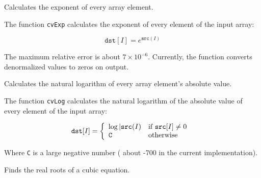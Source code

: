 Calculates the exponent of every array element.


\begin{description}
\end{description}


The function \texttt{cvExp} calculates the exponent of every element of the input array:

\[
\texttt{dst} [I] = e^{\texttt{src}(I)}
\]

The maximum relative error is about $7 \times 10^{-6}$. Currently, the function converts denormalized values to zeros on output.

\label{Log}

Calculates the natural logarithm of every array element's absolute value.


\begin{description}
\end{description}

The function \texttt{cvLog} calculates the natural logarithm of the absolute value of every element of the input array:

\[
\texttt{dst} [I] = \left\{ \begin{array}{l l} \log{|\texttt{src}(I)} & \mbox{if $\texttt{src}[I] \ne 0$ }\\ \texttt{C} & \mbox{otherwise}\\ \end{array} \right.
\]

Where \texttt{C} is a large negative number ( about -700 in the current implementation).

\label{SolveCubic}

Finds the real roots of a cubic equation.


\begin{description}
\end{description}

